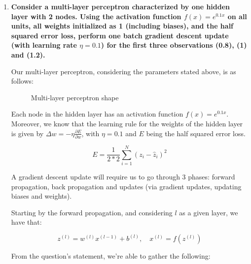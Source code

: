 \documentclass[12pt]{article}
\begin{document}
\begin{enumerate}[leftmargin=\labelsep]
        \pagebreak

  \item \textbf{Consider a multi-layer perceptron characterized by one hidden layer with 2 nodes.
          Using the activation function $f(x) = e^{0.1x}$ on all units, all weights
          initialized as 1 (including biases), and the half squared error loss, perform
          one batch gradient descent update (with learning rate $\eta = 0.1$)
          for the first three observations (0.8), (1) and (1.2).
        }

        Our multi-layer perceptron, considering the parameters stated above, is as follows:

        \begin{figure}[H]
          \centering
          
          \caption{Multi-layer perceptron shape}
        \end{figure}

        Each node in the hidden layer has an activation function $f(x) = e^{0.1x}$.
        Moreover, we know that the learning rule for the weights of the hidden layer
        is given by $\Delta w = - \eta \frac{\partial E}{\partial w}$, with $\eta = 0.1$
        and $E$ being the half squared error loss.

        \begin{equation*}
          E = \frac{1}{2 * 2} \sum_{i=1}^N (z_i - \hat{z}_i)^2
        \end{equation*}

        A gradient descent update will require us to go through 3 phases: forward
        propagation, back propagation and updates (via gradient updates, updating
        biases and weights).

        Starting by the forward propagation, and considering $l$ as a given layer,
        we have that:

        \begin{equation*}
          z^{(l)} = w^{(l)} x^{(l - 1)} + b^{(l)}, \quad x^{(l)} = f(z^{(l)})
        \end{equation*}

        From the question's statement, we're able to gather the following:


\end{enumerate}
\end{document}
